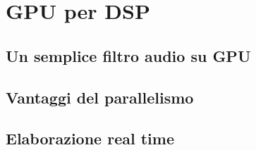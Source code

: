 \chapter{GPU per DSP}
\section{Un semplice filtro audio su GPU}
\section{Vantaggi del parallelismo}
\section{Elaborazione real time}